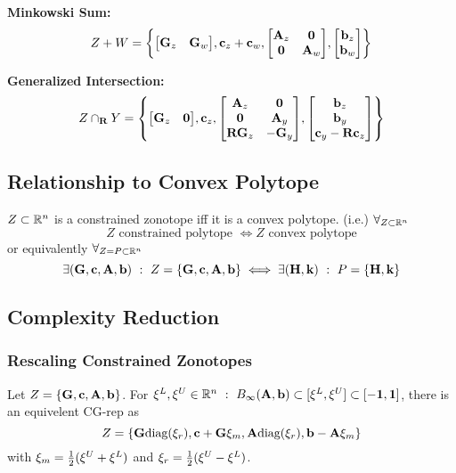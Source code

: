 \textbf{Minkowski Sum:}
\begin{equation}
    Z + W    = \qty{
        \mqty[\vb{G}_z & \vb{G}_w], 
        \vb{c}_z + \vb{c}_w, 
        \mqty[
            \vb{A}_z & \vb{0}\\
            \vb{0}   &\vb{A}_w
        ],
        \mqty[
            \vb{b}_z\\
            \vb{b}_w
        ]
    }
\end{equation}

\textbf{Generalized Intersection:}
\begin{equation}
    Z \cap_{\vb{R}} Y = \qty{
        \mqty[\vb{G}_z & \vb{0}],
        \vb{c}_z,
        \mqty[
            \vb{A}_z &\vb{0}\\
            \vb{0} &\vb{A}_y\\
            \vb{R} \vb{G}_z &-\vb{G}_y
        ],
        \mqty[
            \vb{b}_z\\
            \vb{b}_y\\
            \vb{c}_y - \vb{R} \vb{c}_z
        ]
    }
\end{equation}

\subsection{Relationship to Convex Polytope}
$Z \subset \mathbb{R}^n$ is a constrained zonotope iff it is a convex polytope.
(i.e.) $\forall_{Z \subset \mathbb{R}^n}$ \[
     Z \text{ constrained polytope } \iff Z \text{ convex polytope}
\] or equivalently $\forall_{Z = P \subset \mathbb{R}^n}$ \[
    \exists \qty(\vb{G}, \vb{c}, \vb{A}, \vb{b}) \ : \  Z = \{\vb{G}, \vb{c}, \vb{A}, \vb{b}\}
    \iff \exists \qty(\vb{H}, \vb{k}) \ : \  P = \{\vb{H}, \vb{k}\}
\]

\subsection{Complexity Reduction}
\subsubsection{Rescaling Constrained Zonotopes}
Let $Z = \{\vb{G}, \vb{c}, \vb{A}, \vb{b}\}$.
For $\xi^{L}, \xi^{U} \in \mathbb{R}^n \ : \  B_\infty(\vb{A},\vb{b}) \subset [\xi^{L},\xi^{U}] \subset [-\vb{1}, \vb{1}]$, there is an equivelent CG-rep as \begin{equation}
    Z = \qty{
        \vb{G} \text{diag}(\vb{\xi}_r), 
        \vb{c} + \vb{G} \vb{\xi}_m,
        \vb{A} \text{diag}(\vb{\xi}_r),
        \vb{b} - \vb{A} \vb{\xi}_m
    }
\end{equation}
with $\vb{\xi}_m = \frac{1}{2} (\vb{\xi}^{U} + \vb{\xi}^{L})$ and $\vb{\xi}_r = \frac{1}{2} (\vb{\xi}^{U} - \vb{\xi}^{L})$.

